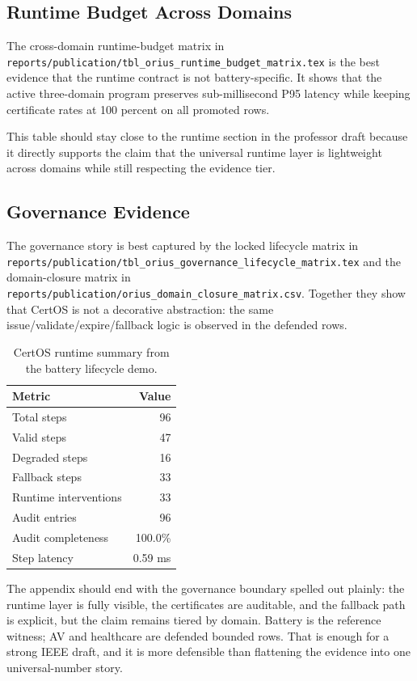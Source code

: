 \subsection{Runtime Budget Across Domains}
The cross-domain runtime-budget matrix in
\texttt{reports/publication/tbl\_orius\_runtime\_budget\_matrix.tex} is the
best evidence that the runtime contract is not battery-specific.  It shows
that the active three-domain program preserves sub-millisecond P95 latency while
keeping certificate rates at 100 percent on all promoted rows.



This table should stay close to the runtime section in the professor draft
because it directly supports the claim that the universal runtime layer is
lightweight across domains while still respecting the evidence tier.

\subsection{Governance Evidence}
The governance story is best captured by the locked lifecycle matrix in
\texttt{reports/publication/tbl\_orius\_governance\_lifecycle\_matrix.tex} and
the domain-closure matrix in \texttt{reports/publication/orius\_domain\_closure\_matrix.csv}.
Together they show that CertOS is not a decorative abstraction: the same
issue/validate/expire/fallback logic is observed in the defended rows.

\begin{table}[t]
\centering
\caption{CertOS runtime summary from the battery lifecycle demo.}
\label{tab:prof-certos-summary}
\begin{tabular}{lr}
\toprule
\textbf{Metric} & \textbf{Value} \\
\midrule
Total steps & 96 \\
Valid steps & 47 \\
Degraded steps & 16 \\
Fallback steps & 33 \\
Runtime interventions & 33 \\
Audit entries & 96 \\
Audit completeness & 100.0\% \\
Step latency & 0.59 ms \\
\bottomrule
\end{tabular}
\end{table}

The appendix should end with the governance boundary spelled out plainly:
the runtime layer is fully visible, the certificates are auditable, and the
fallback path is explicit, but the claim remains tiered by domain. Battery
is the reference witness; AV and healthcare are defended bounded rows. That
is enough for a strong IEEE draft, and it is more defensible than flattening
the evidence into one universal-number story.

